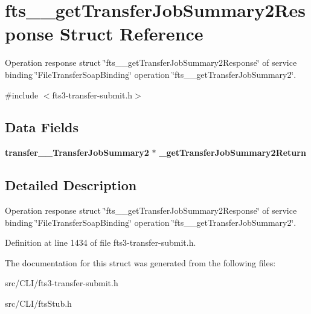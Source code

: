 \section{fts\_\-\_\-getTransferJobSummary2Response Struct Reference}
\label{structfts____getTransferJobSummary2Response}


Operation response struct \char`\"{}fts\_\-\_\-getTransferJobSummary2Response\char`\"{} of service binding \char`\"{}FileTransferSoapBinding\char`\"{} operation \char`\"{}fts\_\-\_\-getTransferJobSummary2\char`\"{}.  




{\ttfamily \#include $<$fts3-\/transfer-\/submit.h$>$}

\subsection*{Data Fields}
\begin{DoxyCompactItemize}
\item 
{\bf transfer\_\-\_\-TransferJobSummary2} $\ast$ {\bfseries \_\-getTransferJobSummary2Return}\label{structfts____getTransferJobSummary2Response_af65006c186284f13a80d87804e2d5c42}

\end{DoxyCompactItemize}


\subsection{Detailed Description}
Operation response struct \char`\"{}fts\_\-\_\-getTransferJobSummary2Response\char`\"{} of service binding \char`\"{}FileTransferSoapBinding\char`\"{} operation \char`\"{}fts\_\-\_\-getTransferJobSummary2\char`\"{}. 

Definition at line 1434 of file fts3-\/transfer-\/submit.h.



The documentation for this struct was generated from the following files:\begin{DoxyCompactItemize}
\item 
src/CLI/fts3-\/transfer-\/submit.h\item 
src/CLI/ftsStub.h\end{DoxyCompactItemize}

